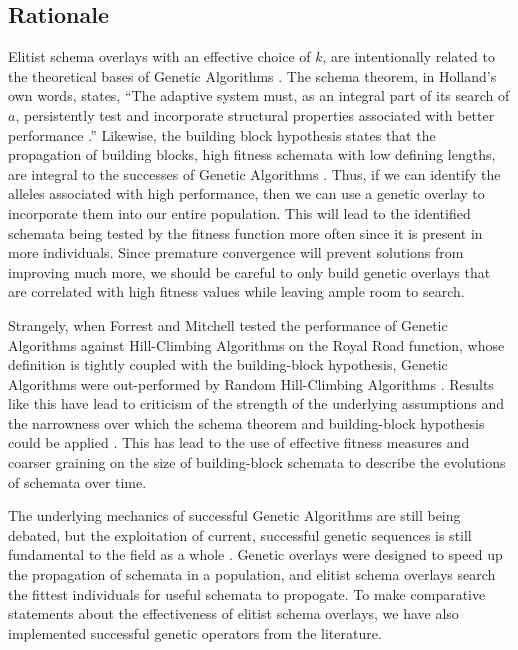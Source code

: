 \subsection*{Rationale}
Elitist schema overlays with an effective choice of $k$, are intentionally related to the theoretical bases of Genetic Algorithms \cite{Goldberg89, Holland75}. The schema theorem, in Holland's own words, states, ``The adaptive system must, as an integral part of its search of $a$, persistently test and incorporate structural properties associated with better performance \cite{Holland75}.'' Likewise, the building block hypothesis states that the propagation of building blocks, high fitness schemata with low defining lengths, are integral to the successes of Genetic Algorithms \cite{Goldberg89}. Thus, if we can identify the alleles associated with high performance, then we can use a genetic overlay to incorporate them into our entire population. This will lead to the identified schemata being tested by the fitness function more often since it is present in more individuals. Since premature convergence will prevent solutions from improving much more, we should be careful to only build genetic overlays that are correlated with high fitness values while leaving ample room to search.

Strangely, when Forrest and Mitchell tested the performance of Genetic Algorithms against Hill-Climbing Algorithms on the Royal Road function, whose definition is tightly coupled with the building-block hypothesis, Genetic Algorithms were out-performed by Random Hill-Climbing Algorithms \cite{Forrest93}. Results like this have lead to criticism of the strength of the underlying assumptions and the narrowness over which the schema theorem and building-block hypothesis could be applied \cite{Burjorjee08, Senaratna05}. This has lead to the use of effective fitness measures and coarser graining on the size of building-block schemata to describe the evolutions of schemata over time\cite{Stephens99}.

The underlying mechanics of successful Genetic Algorithms are still being debated, but the exploitation of current, successful genetic sequences is still fundamental to the field as a whole \cite{Russell10, Senaratna05}. Genetic overlays were designed to speed up the propagation of schemata in a population, and elitist schema overlays search the fittest individuals for useful schemata to propogate. To make comparative statements about the effectiveness of elitist schema overlays, we have also implemented successful genetic operators from the literature.
